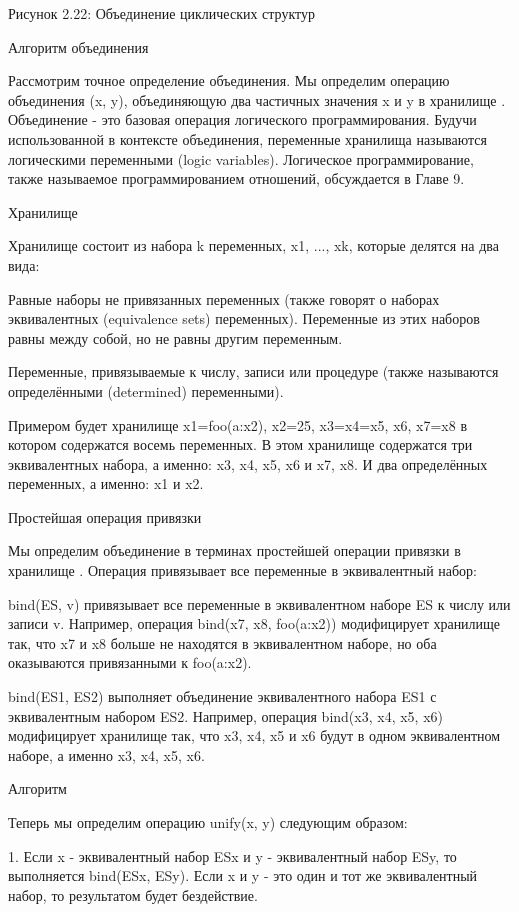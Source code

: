 Рисунок 2.22: Объединение циклических структур

Алгоритм объединения

Рассмотрим точное определение объединения. Мы определим операцию объединения (x, y), объединяющую два частичных значения x и y в хранилище . Объединение - это базовая операция логического программирования. Будучи использованной в контексте объединения, переменные хранилища называются логическими переменными (logic variables). Логическое программирование, также называемое программированием отношений, обсуждается в Главе 9.

Хранилище

Хранилище состоит из набора k переменных, x1, ..., xk, которые делятся на два вида:

Равные наборы не привязанных переменных (также говорят о наборах эквивалентных (equivalence sets) переменных). Переменные из этих наборов равны между собой, но не равны другим переменным.

Переменные, привязываемые к числу, записи или процедуре (также называются определёнными (determined) переменными).

Примером будет хранилище {x1=foo(a:x2), x2=25, x3=x4=x5, x6, x7=x8} в котором содержатся восемь переменных. В этом хранилище содержатся три эквивалентных набора, а именно: {x3, x4, x5}, {x6} и {x7, x8}. И два определённых переменных, а именно: x1 и x2.

Простейшая операция привязки

Мы определим объединение в терминах простейшей операции привязки в хранилище . Операция привязывает все переменные в эквивалентный набор:

bind(ES, v) привязывает все переменные в эквивалентном наборе ES к числу или записи v. Например, операция bind({x7, x8}, foo(a:x2)) модифицирует хранилище так, что x7 и x8 больше не находятся в эквивалентном наборе, но оба оказываются привязанными к foo(a:x2).

bind(ES1, ES2) выполняет объединение эквивалентного набора ES1 с эквивалентным набором ES2. Например, операция bind({x3, x4, x5}, {x6}) модифицирует хранилище так, что x3, x4, x5 и x6 будут в одном эквивалентном наборе, а именно {x3, x4, x5, x6}.

Алгоритм

Теперь мы определим операцию unify(x, y) следующим образом:

1. Если x - эквивалентный набор ESx и y - эквивалентный набор ESy, то выполняется bind(ESx, ESy). Если x и y - это один и тот же эквивалентный набор, то результатом будет бездействие.

